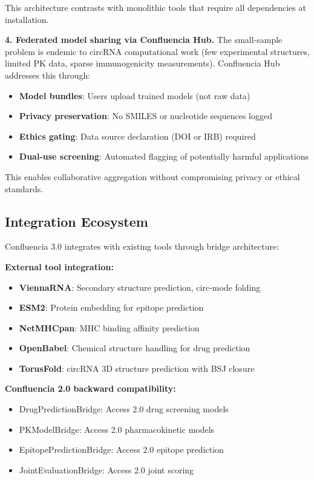 \documentclass[12pt]{article}
\begin{document}
This architecture contrasts with monolithic tools that require all dependencies at installation.

\textbf{4. Federated model sharing via Confluencia Hub.} The small-sample problem is endemic to circRNA computational work (few experimental structures, limited PK data, sparse immunogenicity measurements). Confluencia Hub addresses this through:

\begin{itemize}
\item \textbf{Model bundles}: Users upload trained models (not raw data)
\item \textbf{Privacy preservation}: No SMILES or nucleotide sequences logged
\item \textbf{Ethics gating}: Data source declaration (DOI or IRB) required
\item \textbf{Dual-use screening}: Automated flagging of potentially harmful applications
\end{itemize}

This enables collaborative aggregation without compromising privacy or ethical standards.

\subsection{Integration Ecosystem}

Confluencia 3.0 integrates with existing tools through bridge architecture:

\textbf{External tool integration:}
\begin{itemize}
\item \textbf{ViennaRNA}: Secondary structure prediction, circ-mode folding
\item \textbf{ESM2}: Protein embedding for epitope prediction
\item \textbf{NetMHCpan}: MHC binding affinity prediction
\item \textbf{OpenBabel}: Chemical structure handling for drug prediction
\item \textbf{TorusFold}: circRNA 3D structure prediction with BSJ closure
\end{itemize}

\textbf{Confluencia 2.0 backward compatibility:}
\begin{itemize}
\item DrugPredictionBridge: Access 2.0 drug screening models
\item PKModelBridge: Access 2.0 pharmacokinetic models
\item EpitopePredictionBridge: Access 2.0 epitope prediction
\item JointEvaluationBridge: Access 2.0 joint scoring
\end{itemize}
\end{document}
